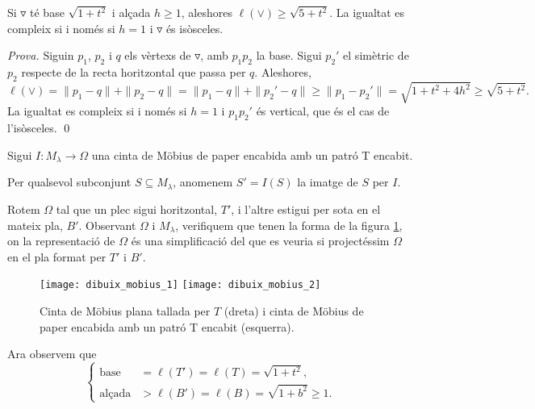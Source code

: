 \begin{defi}
    Si $\triangledown$ té base $\sqrt{1+t^2}$ i alçada $h\ge1$, aleshores $\ell(\lor)\ge\sqrt{5+t^2}$. La igualtat es compleix si i només si $h=1$ i $\triangledown$ és isòsceles.
\end{defi}

{
    \color{black}
    \textit{Prova.}
    Siguin $p_1$, $p_2$ i $q$ els vèrtexs de $\triangledown$, amb $p_1p_2$ la base. Sigui $p_2'$ el simètric de $p_2$ respecte de la recta horitzontal que passa per $q$. Aleshores,
    \begin{equation*}
        \ell(\lor) = \|p_1-q\| + \|p_2-q\| = \|p_1-q\| + \|p_2'-q\| \ge \|p_1-p_2'\| = \sqrt{1+t^2+4h^2}\ge\sqrt{5+t^2}.
    \end{equation*}
    La igualtat es compleix si i només si $h=1$ i $p_1p_2'$ és vertical, que és el cas de l'isòsceles.
    \qed
}

Sigui $I:M_\lambda\to\Omega$ una cinta de Möbius de paper encabida amb un patró T encabit.
\begin{nota}
    Per qualsevol subconjunt $S\subseteq M_\lambda$, anomenem $S'=I(S)$ la imatge de $S$ per $I$.
\end{nota}

Rotem $\Omega$ tal que un plec sigui horitzontal, $T'$, i l'altre estigui per sota en el mateix pla, $B'$. Observant $\Omega$ i $M_\lambda$, verifiquem que tenen la forma de la figura \ref{fig:mobius_1}, on la representació de $\Omega$ és una simplificació del que es veuria si projectéssim $\Omega$ en el pla format per $T'$ i $B'$.

\begin{figure}[htbp]
    \centering
    \texttt{[image: dibuix\_mobius\_1]}
    \quad
    \raisebox{4\height}{$\xrightarrow{\scalebox{1.5}{$I$}}$}
    \quad
    \texttt{[image: dibuix\_mobius\_2]}
    \caption{Cinta de Möbius plana tallada per $T$ (dreta) i cinta de Möbius de paper encabida amb un patró T encabit (esquerra).}
    \label{fig:mobius_1}
\end{figure}

Ara observem que 
\begin{equation*}
    \begin{cases}
        \text{base} &= \ell(T') = \ell(T) = \sqrt{1+t^2},\\
        \text{alçada} &> \ell(B') = \ell(B) = \sqrt{1+b^2}\ge1.
    \end{cases}
\end{equation*}

